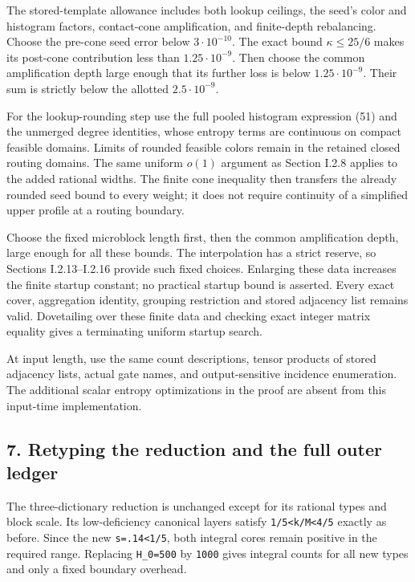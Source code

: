 The stored-template allowance includes both lookup ceilings, the seed's color and histogram factors, contact-cone amplification, and finite-depth rebalancing. Choose the pre-cone seed error below \(3\cdot10^{-10}\). The exact bound \(\kappa\le25/6\) makes its post-cone contribution less than \(1.25\cdot10^{-9}\). Then choose the common amplification depth large enough that its further loss is below \(1.25\cdot10^{-9}\). Their sum is strictly below the allotted \(2.5\cdot10^{-9}\).

For the lookup-rounding step use the full pooled histogram expression (51) and the unmerged degree identities, whose entropy terms are continuous on compact feasible domains. Limits of rounded feasible colors remain in the retained closed routing domains. The same uniform \(o(1)\) argument as Section I.2.8 applies to the added rational widths. The finite cone inequality then transfers the already rounded seed bound to every weight; it does not require continuity of a simplified upper profile at a routing boundary.

Choose the fixed microblock length first, then the common amplification depth, large enough for all these bounds. The interpolation has a strict reserve, so Sections I.2.13--I.2.16 provide such fixed choices. Enlarging these data increases the finite startup constant; no practical startup bound is asserted. Every exact cover, aggregation identity, grouping restriction and stored adjacency list remains valid. Dovetailing over these finite data and checking exact integer matrix equality gives a terminating uniform startup search.

At input length, use the same count descriptions, tensor products of stored adjacency lists, actual gate names, and output-sensitive incidence enumeration. The additional scalar entropy optimizations in the proof are absent from this input-time implementation.

\hypertarget{af-a9ec399514-retyping-the-reduction-and-the-full-outer-ledger}{%
\subsection{7. Retyping the reduction and the full outer ledger}\label{af-a9ec399514-retyping-the-reduction-and-the-full-outer-ledger}}

The three-dictionary reduction is unchanged except for its rational types and block scale. Its low-deficiency canonical layers satisfy \texttt{1/5\textless{}k/M\textless{}4/5} exactly as before. Since the new \texttt{s=.14\textless{}1/5}, both integral cores remain positive in the required range. Replacing \texttt{H\_0=500} by \texttt{1000} gives integral counts for all new types and only a fixed boundary overhead.

